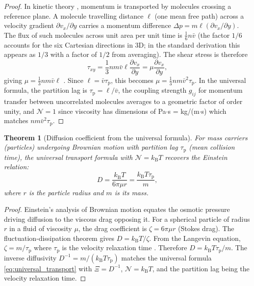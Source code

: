 \documentclass[twocolumn,10pt,a4paper]{article}
\newtheorem{theorem}{Theorem}[section]
\theoremstyle{definition}
\theoremstyle{remark}
\newcommand{\kB}{k_{\mathrm{B}}}
\newcommand{\tauP}{\tau_{\mathrm{p}}}
\begin{document}
\begin{proof}
In kinetic theory \citep{Boltzmann1896, LandauLifshitz1980}, momentum is transported by molecules crossing a reference plane. A molecule travelling distance $\ell$ (one mean free path) across a velocity gradient $\partial v_x / \partial y$ carries a momentum difference $\Delta p = m \ell (\partial v_x / \partial y)$. The flux of such molecules across unit area per unit time is $\frac{1}{6} n \bar{v}$ (the factor $1/6$ accounts for the six Cartesian directions in 3D; in the standard derivation this appears as $1/3$ with a factor of $1/2$ from averaging). The shear stress is therefore
\begin{equation}
\tau_{xy} = \frac{1}{3} n m \bar{v} \ell \frac{\partial v_x}{\partial y} = \mu \frac{\partial v_x}{\partial y},
\end{equation}
giving $\mu = \frac{1}{3} nm\bar{v}\ell$ \citep{Stokes1845}. Since $\ell = \bar{v}\tauP$, this becomes $\mu = \frac{1}{3}nm\bar{v}^2\tauP$. In the universal formula, the partition lag is $\tauP = \ell/\bar{v}$, the coupling strength $g_{ij}$ for momentum transfer between uncorrelated molecules averages to a geometric factor of order unity, and $\mathcal{N} = 1$ since viscosity has dimensions of Pa$\cdot$s = kg/(m$\cdot$s) which matches $nm\bar{v}^2\tauP$.
\end{proof}

\begin{theorem}[Diffusion coefficient from the universal formula]\label{thm:diffusion}
For mass carriers (particles) undergoing Brownian motion with partition lag $\tauP$ (mean collision time), the universal transport formula with $\mathcal{N} = \kB T$ recovers the Einstein relation:
\begin{equation}\label{eq:einstein}
D = \frac{\kB T}{6\pi \mu r} = \frac{\kB T \tauP}{m},
\end{equation}
where $r$ is the particle radius and $m$ is its mass.
\end{theorem}

\begin{proof}
Einstein's analysis of Brownian motion \citep{Einstein1905} equates the osmotic pressure driving diffusion to the viscous drag opposing it. For a spherical particle of radius $r$ in a fluid of viscosity $\mu$, the drag coefficient is $\zeta = 6\pi\mu r$ (Stokes drag). The fluctuation-dissipation theorem \citep{Kubo1957} gives $D = \kB T / \zeta$. From the Langevin equation, $\zeta = m/\tauP$ where $\tauP$ is the velocity relaxation time \citep{DeGroot1962}. Therefore $D = \kB T \tauP / m$. The inverse diffusivity $D^{-1} = m/(\kB T \tauP)$ matches the universal formula \eqref{eq:universal_transport} with $\Xi = D^{-1}$, $\mathcal{N} = \kB T$, and the partition lag being the velocity relaxation time.
\end{proof}
\end{document}
